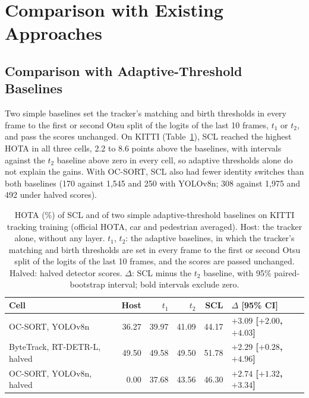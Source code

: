 \section{Comparison with Existing Approaches}\label{sec:res-compare}

\subsection{Comparison with Adaptive-Threshold Baselines}\label{sec:res-baselines}
Two simple baselines set the tracker's matching and birth thresholds in every frame to the first or second Otsu split of the logits of the last 10 frames, $t_1$ or $t_2$, and pass the scores unchanged. On KITTI (Table~\ref{tab:res-baselines}), SCL reached the highest HOTA in all three cells, 2.2 to 8.6 points above the baselines, with intervals against the $t_2$ baseline above zero in every cell, so adaptive thresholds alone do not explain the gains. With OC-SORT, SCL also had fewer identity switches than both baselines (170 against 1,545 and 250 with YOLOv8n; 308 against 1,975 and 492 under halved scores).

\begin{table}[tbp]
\centering
\caption{HOTA (\%) of SCL and of two simple adaptive-threshold baselines on KITTI tracking training (official HOTA, car and pedestrian averaged). Host: the tracker alone, without any layer. $t_1$, $t_2$: the adaptive baselines, in which the tracker's matching and birth thresholds are set in every frame to the first or second Otsu split of the logits of the last 10 frames, and the scores are passed unchanged. Halved: halved detector scores. $\Delta$: SCL minus the $t_2$ baseline, with 95\% paired-bootstrap interval; bold intervals exclude zero.}
\label{tab:res-baselines}
\begin{tabular}{lrrrrl}
\toprule
Cell & Host & $t_1$ & $t_2$ & SCL & $\Delta$ [95\% CI]\\
\midrule
OC-SORT, YOLOv8n & 36.27 & 39.97 & 41.09 & 44.17 & \textbf{$+3.09$ [$+2.00$, $+4.03$]}\\
ByteTrack, RT-DETR-L, halved & 49.50 & 49.58 & 49.50 & 51.78 & \textbf{$+2.29$ [$+0.28$, $+4.96$]}\\
OC-SORT, YOLOv8n, halved & 0.00 & 37.68 & 43.56 & 46.30 & \textbf{$+2.74$ [$+1.32$, $+3.34$]}\\
\bottomrule
\end{tabular}
\end{table}

